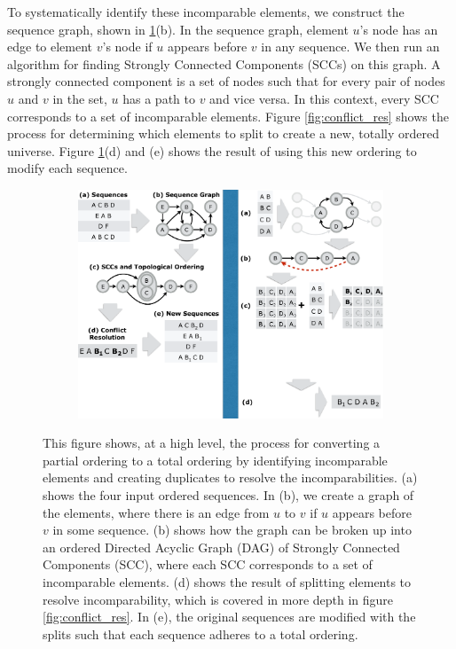 To systematically identify these incomparable elements, we construct the sequence graph, shown in \ref{fig:ordering}(b). In the sequence graph, element $u$'s node has an edge to element $v$'s node if $u$ appears before $v$ in any sequence. We then run an algorithm for finding Strongly Connected Components (SCCs) on this graph. A strongly connected component is a set of nodes such that for every pair of nodes $u$ and $v$ in the set, $u$ has a path to $v$ and vice versa. In this context, every SCC corresponds to a set of incomparable elements. Figure \ref{fig:conflict_res} shows the process for determining which elements to split to create a new, totally ordered universe. Figure \ref{fig:ordering}(d) and (e) shows the result of using this new ordering to modify each sequence. 


\begin{figure}[t!] 
\begin{minipage}{1\linewidth}
\begin{subfigure}[c]{0.96\linewidth}
\includegraphics[trim={0 6cm 19.2cm 0}, clip, width=\linewidth]{figures/partial_ordering}
\end{subfigure} 
\end{minipage} 
\caption{This figure shows, at a high level, the process for converting a partial ordering to a total ordering by identifying incomparable elements and creating duplicates to resolve the incomparabilities. (a) shows the four input ordered sequences. In (b), we create a graph of the elements, where there is an edge from $u$ to $v$ if $u$ appears before $v$ in some sequence. (b) shows how the graph can be broken up into an ordered Directed Acyclic Graph (DAG) of Strongly Connected Components (SCC), where each SCC corresponds to a set of incomparable elements. (d) shows the result of splitting elements to resolve incomparability, which is covered in more depth in figure \ref{fig:conflict_res}. In (e), the original sequences are modified with the splits such that each sequence adheres to a total ordering.}
\label{fig:ordering}
\end{figure}



